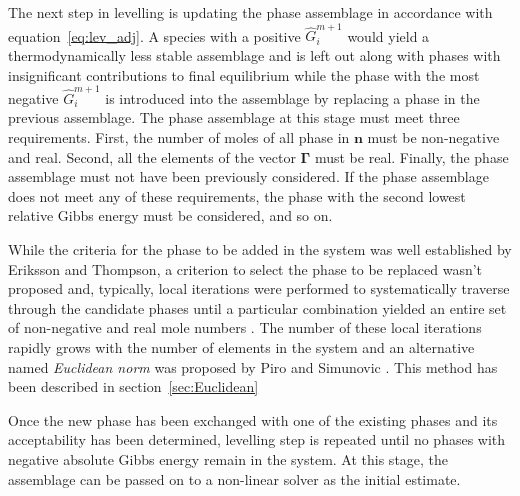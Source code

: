 	The next step in levelling is updating the phase assemblage in accordance with equation~\eqref{eq:lev_adj}. A  species with a positive $\hat{G}_i^{m+1}$ would yield a thermodynamically less stable assemblage and is left out along with phases with insignificant contributions to final equilibrium while the phase with the most negative $\hat{G}_i^{m+1}$ is introduced into the assemblage by replacing a phase in the previous assemblage. The phase assemblage at this stage must meet three requirements. First, the number of moles of all phase in $\mathbf{n}$ must be non-negative and real. Second, all the elements of the vector $\boldsymbol{\Gamma}$ must be real. Finally, the phase assemblage must not have been previously considered. If the phase assemblage does not meet any of these requirements, the phase with the second lowest relative Gibbs energy must be considered, and so on.

	While the criteria for the phase to be added in the system was well established by Eriksson and Thompson, a criterion to select the phase to be replaced wasn't proposed and, typically, local iterations were performed to systematically traverse through the candidate phases until a particular combination yielded an entire set of non-negative and real mole numbers \cite{Eriksson89}. The number of these local iterations rapidly grows with the number of elements in the system and an alternative named \emph{Euclidean norm} was proposed by Piro and Simunovic \cite{Piro12a}. This method has been described in section~\ref{sec:Euclidean}

	Once the new phase has been exchanged with one of the existing phases and its acceptability has been determined, levelling step is repeated until no phases with negative absolute Gibbs energy remain in the system. At this stage, the assemblage can be passed on to a non-linear solver as the initial estimate.


